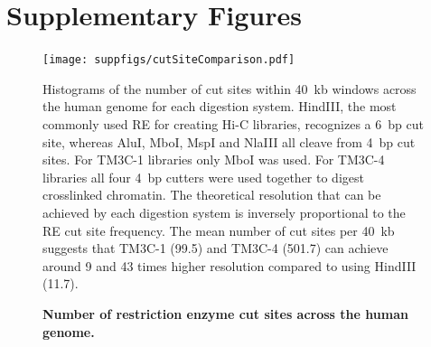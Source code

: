 \section{Supplementary Figures}


\begin{figure}[ht!]
\begin{center}
\texttt{[image: suppfigs/cutSiteComparison.pdf]}
\end{center}
\caption{\bf Number of restriction enzyme cut sites across the human genome.}
{Histograms of the number of cut sites within 40~kb windows across the human
    genome for each digestion system. HindIII, the most commonly used RE
    for creating Hi-C libraries, recognizes a 6~bp cut site, whereas AluI,
    MboI, MspI and NlaIII all cleave from 4~bp cut sites. For TM3C-1 libraries
    only MboI was used. For TM3C-4 libraries all four 4~bp cutters were used
    together to digest crosslinked chromatin. The theoretical resolution that can
    be achieved by each digestion system is inversely proportional to the
    RE cut site frequency. The mean number of cut sites per 40~kb suggests that
    TM3C-1 (99.5) and TM3C-4 (501.7) can achieve around 9 and 43 times
    higher resolution compared to using HindIII (11.7).
}
\label{suppfig:cutSiteComparison}
\end{figure}
\clearpage

